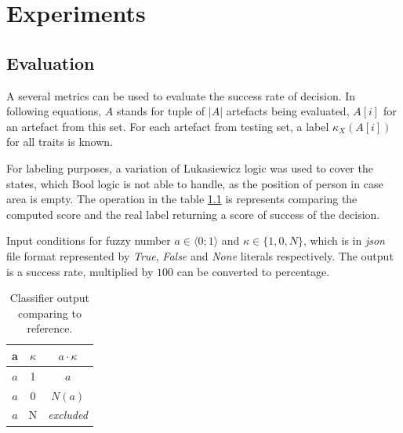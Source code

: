 



\chapter{Experiments}

\section{Evaluation}
\label{section:evaluationMetrics}
A several metrics can be used to evaluate the success rate of decision.
In following equations, $A$ stands for tuple of $|A|$ artefacts being
evaluated, $A[i]$ for an artefact from this set. For each artefact from testing
set, a label $\kappa_{X}(A[i])$ for all traits is known.

For labeling purposes, a variation of Lukasiewicz logic was used to cover
the states, which Bool logic is not able to handle, as the position of person
in case area is empty. The operation in the table \ref{table:3stateLogicOp} is
represents comparing the computed score and the real label returning a score
of success of the decision.

Input conditions for fuzzy number $a \in \langle 0;1 \rangle$
and $\kappa \in \{ 1, 0, N\}$, which is in {\it json} file format represented
by {\it True}, {\it False} and {\it None} literals respectively. The output
is a success rate, multiplied by $100$ can be converted to percentage.

\begin{table}
\begin{center}
\begin{tabular}{|c|c|c|} \hline
\textbf{a}  & \textbf{$\kappa$} & \textbf{$a \cdot \kappa$} \\ \hline
$a$         & 1               & $a$                       \\ \hline
$a$         & 0               & $N(a)$                    \\ \hline
$a$         & N               & \it{excluded}             \\ \hline
\end{tabular}
\caption{Classifier output comparing to reference.\label{table:3stateLogicOp} }
\end{center}
\end{table}


